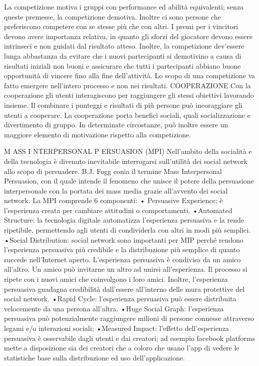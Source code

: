 La competizione motiva i gruppi con performance ed abilità equivalenti; senza queste premesse, la competizione demotiva. Inoltre ci sono persone che preferiscono competere con se stesse più che con altri.
I premi per i vincitori devono avere importanza relativa, in quanto gli sforzi del giocatore devono essere intrinseci e non guidati dal risultato atteso. Inoltre, la competizione dev'essere lunga abbastanza da evitare che i nuovi partecipanti si demotivino a causa di risultati iniziali non buoni e assicurare che tutti i partecipanti abbiano buone opportunità di vincere fino alla fine dell'attività.
Lo scopo di una competizione va fatto emergere nell'intero processo e non nei risultati.
COOPERAZIONE Con la cooperazione gli utenti interagiscono per raggiungere gli stessi obiettivi lavorando insieme. Il combinare i punteggi e risultati di più persone può incoraggiare gli utenti a cooperare.
La cooperazione porta benefici sociali, quali socializzazione e divertimento di gruppo. In determinate circostanze, può inoltre essere un maggiore elemento di motivazione rispetto
alla competizione.

M ASS I NTERPERSONAL P ERSUASION (MPI)
Nell'ambito della socialità e della tecnologia è divenuto inevitabile interrogarsi sull'utilità dei social network allo scopo di persuadere. B.J. Fogg conia il termine Mass Interpersonal Persuasion, con il quale intende il fenomeno che unisce il potere della persuasione interpersonale con la portata dei mass media grazie all'avvento dei social network.
La MPI comprende 6 componenti:
• Persuasive Experience: è l'esperienza creata per cambiare attitudini o comportamenti.
•Automated Structure: la tecnologia digitale automatizza l'esperienza persuasiva e la rende ripetibile, permettendo agli utenti di condividerla con altri in modi più semplici.
•Social Distribution: social network sono importanti per MIP perché rendono l'esperienza persuasiva più credibile e la distribuzione più semplice di quanto succede nell'Internet aperto. L'esperienza persuasiva è condivisa da un amico all'altro. Un amico può invitarne un altro ad unirsi all'esperienza. Il processo si ripete con i nuovi amici che coinvolgono i loro amici.
Inoltre, l'esperienza persuasiva guadagna credibilità dall'essere all'interno delle mura protettive del social network.
•Rapid Cycle: l'esperienza persuasiva può essere distribuita velocemente da una persona all'altra.
•Huge Social Graph: l'esperienza persuasiva può potenzialmente raggiungere milioni di persone connesse attraverso legami e/o interazioni sociali;
•Measured Impact: l'effetto dell'esperienza persuasiva è osservabile dagli utenti e dai creatori; ad esempio facebook platforms mette a disposizione sia dei creatori che a coloro che usano l'app di vedere le statistiche base sulla distribuzione ed uso dell'applicazione.